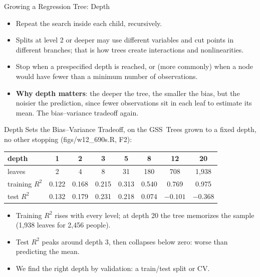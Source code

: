 \documentclass[aspectratio=169,11pt,xcolor=dvipsnames]{beamer}
\newcommand{\srcp}[1]{{\scriptsize\color{gray}(#1)}}
\newcommand{\core}{\,\raisebox{0.6pt}{\textcolor{corestar}{$\bigstar$}}}
\begin{document}
\begin{frame}{Growing a Regression Tree: Depth\core}
\begin{itemize}\itemsep4pt
  \item Repeat the search inside each child, recursively.
  \item Splits at level 2 or deeper may use different variables and cut points in
        different branches; that is how trees create interactions and
        nonlinearities.
  \item Stop when a prespecified depth is reached, or (more commonly) when a node
        would have fewer than a minimum number of observations.
  \item \textbf{Why depth matters}: the deeper the tree, the smaller the bias, but
        the noisier the prediction, since fewer observations sit in each leaf to
        estimate its mean. The bias--variance tradeoff again.
\end{itemize}
\end{frame}

\begin{frame}{Depth Sets the Bias--Variance Tradeoff, on the GSS\core}
Trees grown to a fixed depth, no other stopping \srcp{figs/w12\_690s.R, F2}:
\begin{center}\small
\renewcommand{\arraystretch}{1.1}
\begin{tabular}{@{}lccccccc@{}}
\toprule
depth & 1 & 2 & 3 & 5 & 8 & 12 & 20 \\
\midrule
leaves & 2 & 4 & 8 & 31 & 180 & 708 & 1,938 \\
training $R^2$ & 0.122 & 0.168 & 0.215 & 0.313 & 0.540 & 0.769 & 0.975 \\
test $R^2$ & 0.132 & 0.179 & \alert{0.231} & 0.218 & 0.074 & $-0.101$ & $-0.368$ \\
\bottomrule
\end{tabular}
\end{center}
\vskip3pt
\begin{itemize}\itemsep3pt
  \item Training $R^2$ rises with every level; at depth 20 the tree memorizes the
        sample (1,938 leaves for 2,456 people).
  \item Test $R^2$ peaks around depth 3, then collapses below zero: worse than
        predicting the mean.
  \item We find the right depth by validation: a train/test split or CV.
\end{itemize}
\end{frame}
\end{document}
